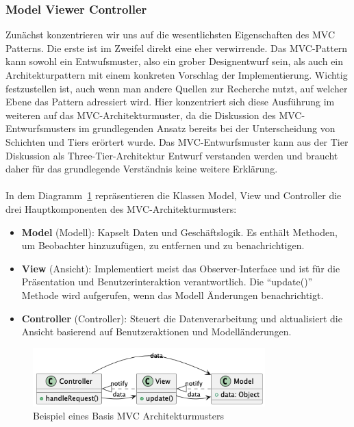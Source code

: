 \documentclass[../vs-script-first-v01.tex]{subfiles}
\begin{document}
\subsubsection{Model Viewer Controller}
Zunächst konzentrieren wir uns auf die wesentlichsten Eigenschaften des MVC Patterns. Die erste ist im Zweifel direkt eine eher verwirrende. Das MVC-Pattern kann sowohl ein Entwufsmuster, also ein grober Designentwurf sein, als auch ein Architekturpattern mit einem konkreten Vorschlag der Implementierung. Wichtig festzustellen ist, auch wenn man andere Quellen zur Recherche nutzt, auf welcher Ebene das Pattern adressiert wird.  Hier konzentriert sich diese Ausführung im weiteren auf das MVC-Architekturmuster, da die Diskussion des MVC-Entwurfsmusters im grundlegenden Ansatz bereits bei der Unterscheidung von Schichten und Tiers erörtert wurde. Das MVC-Entwurfsmuster kann aus der Tier Diskussion als Three-Tier-Architektur Entwurf verstanden werden und braucht daher für das grundlegende Verständnis keine weitere Erklärung.
\\\\
In dem Diagramm~\ref{fig:default-mvc} repräsentieren die Klassen Model, View und Controller die drei Hauptkomponenten des MVC-Architekturmusters:
\begin{itemize}
\item \textbf{Model} (Modell): Kapselt Daten und Geschäftslogik. Es enthält Methoden, um Beobachter hinzuzufügen, zu entfernen und zu benachrichtigen.
\item \textbf{View} (Ansicht): Implementiert meist das Observer-Interface und ist für die Präsentation und Benutzerinteraktion verantwortlich. Die \enquote{update()} Methode wird aufgerufen, wenn das Modell Änderungen benachrichtigt.
\item \textbf{Controller} (Controller): Steuert die Datenverarbeitung und aktualisiert die Ansicht basierend auf Benutzeraktionen und Modelländerungen.
\end{itemize}

\begin{figure}[ht]
  \centering
  \includegraphics[width=0.8\textwidth]{fig/uml/default-mvc.png}
  \caption{Beispiel eines Basis MVC Architekturmusters}
  \label{fig:default-mvc}
\end{figure}
\end{document}
